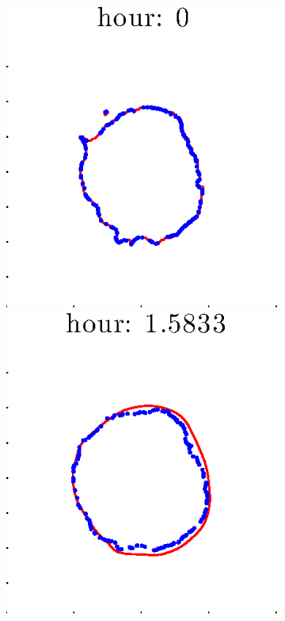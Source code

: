 \documentclass[12pt]{article}
\begin{document}
\begin{figure}[h!]
\begin{subfigure}[b]{.3\textwidth}
	\end{subfigure}
	\begin{subfigure}[b]{.3\textwidth}
	\centering
		\includegraphics[height=.15\textheight]{Pos0/full/first1.eps}
		\includegraphics[height=.15\textheight]{Pos0/full/first2.eps}

\end{subfigure}
\end{figure}
\end{document}

